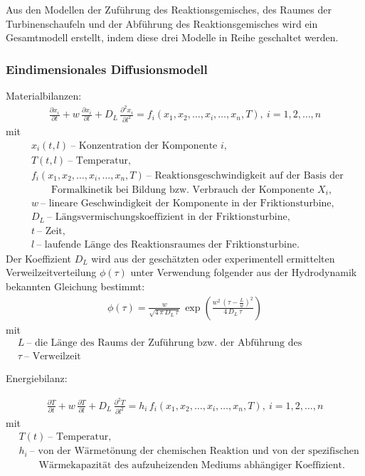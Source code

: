 \documentclass[11pt,a4paper]{article}
\begin{document}
Aus den Modellen der Zuführung des Reaktionsgemisches, des Raumes der
Turbinenschaufeln und der Abführung des Reaktionsgemisches wird ein
Gesamtmodell erstellt, indem diese drei Modelle in Reihe geschaltet werden.

\subsubsection*{Eindimensionales Diffusionsmodell}

Materialbilanzen:
\begin{gather*}
  \frac{\partial x_i}{\partial t} +w\,\frac{\partial x_i}{\partial l}
  +D_L\,\frac{\partial^2 x_i}{\partial l^2} =
  f_i(x_1,x_2,\ldots,x_i,\ldots,x_n,T),\ i=1,2,\ldots,n \tag{1}
\end{gather*}
mit
\begin{align*}
  & x_i(t,l)\ \text{-- Konzentration der Komponente $i$,}\\
  & T(t,l)\ \text{-- Temperatur,}\\
  & f_i(x_1,x_2,\ldots,x_i,\ldots,x_n,T)\ \text{-- Reaktionsgeschwindigkeit auf
    der Basis der }\\
  & \qquad\text{Formalkinetik bei Bildung bzw. Verbrauch der Komponente
    $X_i$,}\\ 
  & w\ \text{-- lineare Geschwindigkeit der Komponente in der
    Friktionsturbine,}\\
  & D_L\ \text{-- Längsvermischungskoeffizient in der Friktionsturbine,}\\
  & t\ \text{-- Zeit,}\\
  & l\ \text{-- laufende Länge des Reaktionsraumes der Friktionsturbine.}
\end{align*}
Der Koeffizient $D_L$ wird aus der geschätzten oder experimentell ermittelten
Verweilzeitverteilung $\phi(\tau)$ unter Verwendung folgender aus der
Hydrodynamik bekannten Gleichung bestimmt:
\begin{gather*}
  \phi(\tau)=\frac{w}{\sqrt{4\,\pi\,D_L\,\tau}}\,
  \exp\left(\frac{w^2\,\left(\tau-\frac{L}{w}\right)^2}{4\,D_L\,\tau}\right)
\end{gather*}
mit 
\begin{align*}
  & L\ \text{-- die Länge des Raums der Zuführung bzw. der Abführung des
    Reaktionsgemisches}\\ 
  & \tau\ \text{-- Verweilzeit}
\end{align*}

Energiebilanz:

\begin{gather*}
  \frac{\partial T}{\partial t} +w\,\frac{\partial T}{\partial l}
  +D_L\,\frac{\partial^2 T}{\partial l^2} =
  h_i\,f_i(x_1,x_2,\ldots,x_i,\ldots,x_n,T),\ i=1,2,\ldots,n \tag{2}
\end{gather*}
mit
\begin{align*}
  & T(t)\ \text{-- Temperatur,}\\
  & h_i\ \text{-- von der Wärmetönung der chemischen Reaktion und von der
    spezifischen}\\
  &\qquad \text{Wärmekapazität des aufzuheizenden Mediums abhängiger
    Koeffizient.} 
\end{align*}
      
\end{document}
